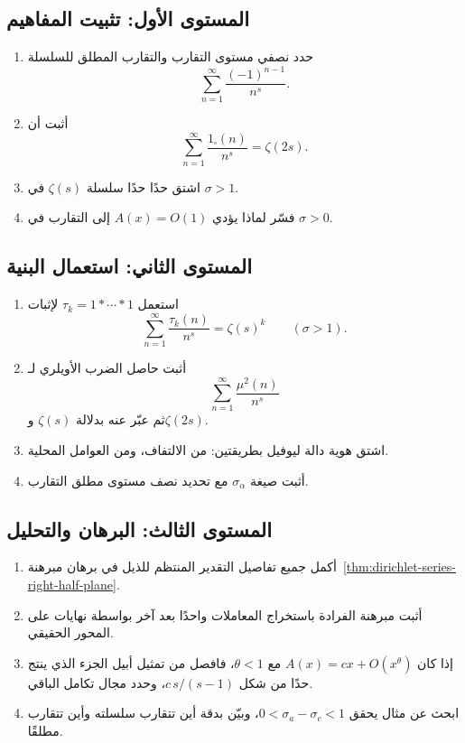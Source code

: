 \subsection{المستوى الأول: تثبيت المفاهيم}

\begin{enumerate}
  \item حدد نصفي مستوى التقارب والتقارب المطلق للسلسلة
  \[
  \sum_{n=1}^{\infty}\frac{(-1)^{n-1}}{n^s}.
  \]
  \item أثبت أن
  \[
  \sum_{n=1}^{\infty}\frac{1_{\square}(n)}{n^s}=\zeta(2s).
  \]
  \item اشتق حدًا حدًا سلسلة \(\zeta(s)\) في \(\sigma>1\).
  \item فسّر لماذا يؤدي \(A(x)=O(1)\) إلى التقارب في \(\sigma>0\).
\end{enumerate}

\subsection{المستوى الثاني: استعمال البنية}

\begin{enumerate}
  \item استعمل \(\tau_k=1*\cdots*1\) لإثبات
  \[
  \sum_{n=1}^{\infty}\frac{\tau_k(n)}{n^s}=\zeta(s)^k
  \qquad(\sigma>1).
  \]
  \item أثبت حاصل الضرب الأويلري لـ
  \[
  \sum_{n=1}^{\infty}\frac{\mu^2(n)}{n^s}
  \]
  ثم عبّر عنه بدلالة \(\zeta(s)\) و\(\zeta(2s)\).
  \item اشتق هوية دالة ليوفيل بطريقتين: من الالتفاف، ومن العوامل المحلية.
  \item أثبت صيغة \(\sigma_\alpha\) مع تحديد نصف مستوى مطلق التقارب.
\end{enumerate}

\subsection{المستوى الثالث: البرهان والتحليل}

\begin{enumerate}
  \item أكمل جميع تفاصيل التقدير المنتظم للذيل في برهان
  مبرهنة~\ref{thm:dirichlet-series-right-half-plane}.
  \item أثبت مبرهنة الفرادة باستخراج المعاملات واحدًا بعد آخر بواسطة نهايات
  على المحور الحقيقي.
  \item إذا كان \(A(x)=cx+O(x^\theta)\) مع \(\theta<1\)، فافصل من تمثيل
  أبيل الجزء الذي ينتج حدًا من شكل \(c\,s/(s-1)\)، وحدد مجال تكامل الباقي.
  \item ابحث عن مثال يحقق \(0<\sigma_a-\sigma_c<1\)، وبيّن بدقة أين
  تتقارب سلسلته وأين تتقارب مطلقًا.
\end{enumerate}

